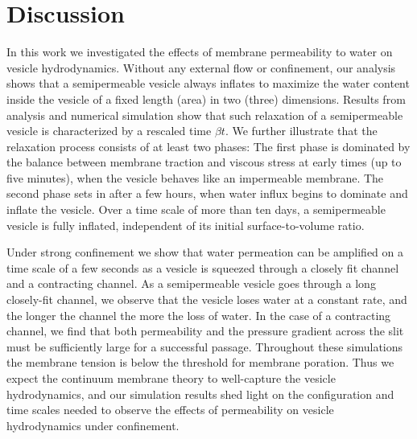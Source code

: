 \documentclass[9pt,twocolumn,twoside,lineno]{pnas-new}
\begin{document}
\section*{Discussion}
In this work we investigated the effects of membrane permeability to
water on vesicle hydrodynamics. Without any external flow or
confinement, our analysis shows that a semipermeable vesicle always
inflates to maximize the water content inside the vesicle of a fixed
length (area) in two (three) dimensions. Results from analysis and
numerical simulation show that such relaxation of a semipermeable
vesicle is characterized by a rescaled time $\beta t$. We further
illustrate that the relaxation process consists of at least two phases:
The first phase is dominated by the balance between membrane traction
and viscous stress at early times (up to five minutes), when the vesicle
behaves like an impermeable membrane. The second phase sets in after a
few hours, when water influx begins to dominate and inflate the
vesicle. Over a time scale of more than ten days, a semipermeable vesicle is
fully inflated, independent of its initial surface-to-volume ratio.

Under strong confinement we show that water permeation can be amplified
on a time scale of a few seconds as a vesicle is squeezed through a
closely fit channel and a contracting channel. As a semipermeable
vesicle goes through a long closely-fit channel, we observe that the
vesicle loses water at a constant rate, and the longer the channel the
more the loss of water. In the case of a contracting channel, we find
that both permeability and the pressure gradient across the slit must be
sufficiently large for a successful passage. Throughout these
simulations the membrane tension is below the threshold for membrane
poration. Thus we expect the continuum membrane theory to well-capture
the vesicle hydrodynamics, and our simulation results shed light on the
configuration and time scales needed to observe the effects of
permeability on vesicle hydrodynamics under confinement. 

% 
 
\end{document}
